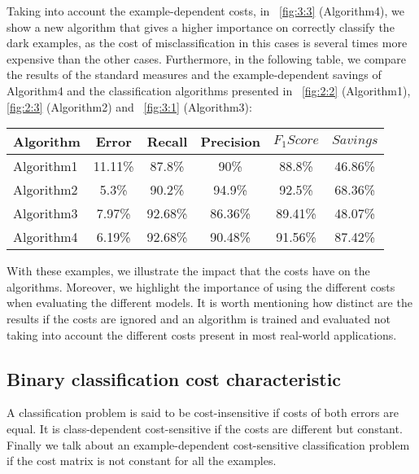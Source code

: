 {{Taking into account the example-dependent costs, in \figurename{~\ref{fig:3:3}} (Algorithm4), we 
show a new algorithm that gives a higher importance on correctly classify the dark examples, as the 
cost of misclassification in this cases is several times more expensive than the other cases.
Furthermore, in the following table, we compare the results of the standard measures and the 
example-dependent savings of Algorithm4 and the classification algorithms presented in 
\figurename{~\ref{fig:2:2}} (Algorithm1), \figurename{ \ref{fig:2:3}} (Algorithm2) and 
\figurename{~\ref{fig:3:1}} (Algorithm3):
\begin{center}
    \footnotesize
  \begin{tabular}{l|c|c|c|c|c}
  Algorithm & Error & Recall & Precision & $F_1Score$ & $Savings$ \\
  \hline
  Algorithm1 & 11.11\% & 87.8\%& 90\%& 88.8\% & 46.86\%\\ %
  Algorithm2 & 5.3\% & 90.2\%& 94.9\%& 92.5\% & 68.36\%\\ %
  Algorithm3 & 7.97\%& 92.68\% &86.36\%& 89.41\% & 48.07\% \\
  Algorithm4 & 6.19\%& 92.68\% &90.48\%& 91.56\% & 87.42\% \\
  \end{tabular}
\end{center}
\vspace{0.3cm}

With these examples, we illustrate the impact that the costs have on the algorithms. 
Moreover, we highlight the importance of using the different costs when evaluating the different 
models. It is worth mentioning how distinct are the results if the costs are ignored and an 
algorithm is trained and evaluated not taking into account the different costs present in most 
real-world 
applications.

  
\subsection{Binary classification cost characteristic}
\label{sec:3:cost_characteristic}  

  A classification problem is said to be cost-insensitive if costs of both errors are equal. It 
  is class-dependent cost-sensitive if the costs are different but constant. Finally we talk 
  about an example-dependent cost-sensitive classification problem if the cost matrix is not 
  constant for all the examples.

}}
